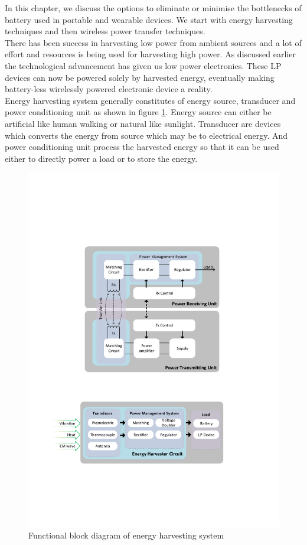 \documentclass[12pt,a4paper,UKenglish]{report}
\begin{document}
In this chapter, we discuss the options to eliminate or minimise the bottlenecks of battery used in portable and 
wearable devices. We start with energy harvesting techniques and then wireless power transfer techniques. \\

There has been success in harvesting low power from ambient sources and a lot of effort and resources is being used for 
harvesting high power. As discussed earlier the technological advancement has given us low power electronics. 
These LP devices can now be powered solely by harvested energy, eventually making battery-less wirelessly powered 
electronic device a reality. \\

Energy harvesting system generally constitutes of energy source, transducer and power conditioning unit as shown 
in figure \ref{fig:visio_harvest_func}. Energy 
source can either be artificial like human walking or natural like sunlight. Transducer are devices which 
converts the energy from source which may be to electrical energy. And power conditioning unit process the 
harvested energy so that it can be used either to directly power a load or to store the energy. \\

\begin{figure}[!htbp] %
   \centering
   \includegraphics[width=\textwidth]{img/visio_harvest_func.pdf}
   \caption{Functional block diagram of energy harvesting system}
   \label{fig:visio_harvest_func}
\end{figure}
\end{document}
